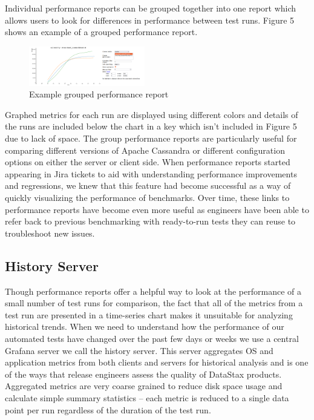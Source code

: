 \documentclass[a4paper,fleqn]{cas-dc}
\begin{document}
Individual performance reports can be grouped together into one report which allows users to
look for differences in performance between test runs. Figure 5 shows an example of a grouped
performance report.

\begin{figure}
	\includegraphics[width=0.45\textwidth]{perf-report}
	\caption{Example grouped performance report}\label{Figure 5}
\end{figure}

Graphed metrics for each run are displayed using different colors and details of the runs are
included below the chart in a key which isn’t included in Figure 5 due to lack of space. The group
performance reports are particularly useful for comparing different versions of Apache Cassandra or
different configuration options on either the server or client side. When performance reports
started appearing in Jira tickets to aid with understanding performance improvements and
regressions, we knew that this feature had become successful as a way of quickly visualizing the
performance of benchmarks. Over time, these links to performance reports have become even more
useful as engineers have been able to refer back to previous benchmarking with ready-to-run tests
they can reuse to troubleshoot new issues.

\subsection{History Server}

Though performance reports offer a helpful way to look at the performance of a small number of test
runs for comparison, the fact that all of the metrics from a test run are presented in a time-series
chart makes it unsuitable for analyzing historical trends. When we need to understand how the
performance of our automated tests have changed over the past few days or weeks we use a central
Grafana server we call the history server. This server aggregates OS and application metrics from
both clients and servers for historical analysis and is one of the ways that release engineers
assess the quality of DataStax products. Aggregated metrics are very coarse grained to reduce disk
space usage and calculate simple summary statistics -- each metric is reduced to a single data point
per run regardless of the duration of the test run.
\end{document}
